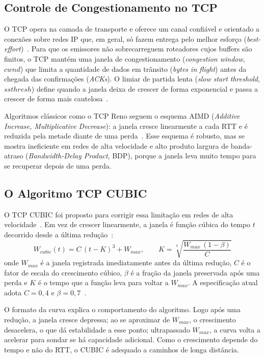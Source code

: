 \documentclass[a4paper,12pt]{monografia}
\begin{document}
\subsection{Controle de Congestionamento no TCP}
O TCP opera na camada de transporte e oferece um canal confiável e orientado a conexões sobre redes IP que, em geral, só fazem entrega pelo melhor esforço (\textit{best-effort})~\cite{rfc9293,kurose2017}. Para que os emissores não sobrecarreguem roteadores cujos buffers são finitos, o TCP mantém uma janela de congestionamento (\textit{congestion window}, $cwnd$) que limita a quantidade de dados em trânsito (\textit{bytes in flight}) antes da chegada das confirmações (\textit{ACKs}). O limiar de partida lenta (\textit{slow start threshold}, $ssthresh$) define quando a janela deixa de crescer de forma exponencial e passa a crescer de forma mais cautelosa~\cite{rfc5681}.

Algoritmos clássicos como o TCP Reno seguem o esquema AIMD (\textit{Additive Increase, Multiplicative Decrease}): a janela cresce linearmente a cada RTT e é reduzida pela metade diante de uma perda~\cite{rfc5681,kurose2017}. Esse esquema é robusto, mas se mostra ineficiente em redes de alta velocidade e alto produto largura de banda-atraso (\textit{Bandwidth-Delay Product}, BDP), porque a janela leva muito tempo para se recuperar depois de uma perda.

\subsection{O Algoritmo TCP CUBIC}
O TCP CUBIC foi proposto para corrigir essa limitação em redes de alta velocidade~\cite{ha2008}. Em vez de crescer linearmente, a janela é função cúbica do tempo $t$ decorrido desde a última redução~\cite{rfc9438}:
\begin{equation}
    W_{cubic}(t) = C\,(t-K)^3 + W_{max}, \qquad K = \sqrt[3]{\frac{W_{max}\,(1-\beta)}{C}}
\end{equation}
onde $W_{max}$ é a janela registrada imediatamente antes da última redução, $C$ é o fator de escala do crescimento cúbico, $\beta$ é a fração da janela preservada após uma perda e $K$ é o tempo que a função leva para voltar a $W_{max}$. A especificação atual adota $C=0{,}4$ e $\beta=0{,}7$~\cite{rfc9438}.

O formato da curva explica o comportamento do algoritmo. Logo após uma redução, a janela cresce depressa; ao se aproximar de $W_{max}$, o crescimento desacelera, o que dá estabilidade a esse ponto; ultrapassado $W_{max}$, a curva volta a acelerar para sondar se há capacidade adicional. Como o crescimento depende do tempo e não do RTT, o CUBIC é adequado a caminhos de longa distância.
\end{document}
